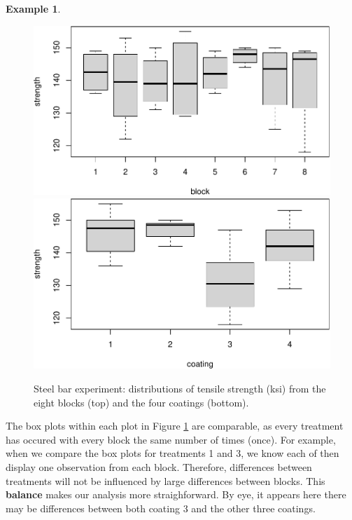 \documentclass[
]{book}
\theoremstyle{definition}
\theoremstyle{definition}
\newtheorem{example}{Example}[chapter]
\theoremstyle{definition}
\theoremstyle{definition}
\theoremstyle{remark}
\begin{document}
\begin{example}
\begin{figure}
{\centering \includegraphics{bookdown_math3014-6027_files/figure-latex/bar-expt-boxplots-1} \includegraphics{bookdown_math3014-6027_files/figure-latex/bar-expt-boxplots-2} 

}

\caption{Steel bar experiment: distributions of tensile strength (ksi) from the eight blocks (top) and the four coatings (bottom).}\label{fig:bar-expt-boxplots}
\end{figure}

The box plots within each plot in Figure \ref{fig:bar-expt-boxplots} are comparable, as every treatment has occured with every block the same number of times (once). For example, when we compare the box plots for treatments 1 and 3, we know each of then display one observation from each block. Therefore, differences between treatments will not be influenced by large differences between blocks. This \textbf{balance} makes our analysis more straighforward. By eye, it appears here there may be differences between both coating 3 and the other three coatings.

\end{example}
\end{document}
